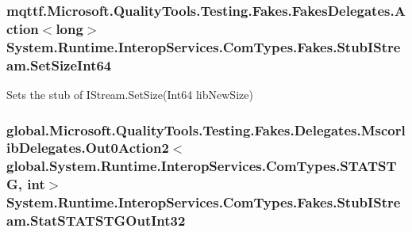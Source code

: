 \hypertarget{class_system_1_1_runtime_1_1_interop_services_1_1_com_types_1_1_fakes_1_1_stub_i_stream_a4c059f3cf2b77be257f79df936ed4b0b}{
\subsubsection[{Set\-Size\-Int64}]{\setlength{\rightskip}{0pt plus 5cm}mqttf.\-Microsoft.\-Quality\-Tools.\-Testing.\-Fakes.\-Fakes\-Delegates.\-Action$<$long$>$ System.\-Runtime.\-Interop\-Services.\-Com\-Types.\-Fakes.\-Stub\-I\-Stream.\-Set\-Size\-Int64}}\label{class_system_1_1_runtime_1_1_interop_services_1_1_com_types_1_1_fakes_1_1_stub_i_stream_a4c059f3cf2b77be257f79df936ed4b0b}


Sets the stub of I\-Stream.\-Set\-Size(\-Int64 lib\-New\-Size)

\hypertarget{class_system_1_1_runtime_1_1_interop_services_1_1_com_types_1_1_fakes_1_1_stub_i_stream_a0dde1c3a1cf70e317622ac332ab59012}{
\subsubsection[{Stat\-S\-T\-A\-T\-S\-T\-G\-Out\-Int32}]{\setlength{\rightskip}{0pt plus 5cm}global.\-Microsoft.\-Quality\-Tools.\-Testing.\-Fakes.\-Delegates.\-Mscorlib\-Delegates.\-Out0\-Action2$<$global.\-System.\-Runtime.\-Interop\-Services.\-Com\-Types.\-S\-T\-A\-T\-S\-T\-G, int$>$ System.\-Runtime.\-Interop\-Services.\-Com\-Types.\-Fakes.\-Stub\-I\-Stream.\-Stat\-S\-T\-A\-T\-S\-T\-G\-Out\-Int32}}\label{class_system_1_1_runtime_1_1_interop_services_1_1_com_types_1_1_fakes_1_1_stub_i_stream_a0dde1c3a1cf70e317622ac332ab59012}


